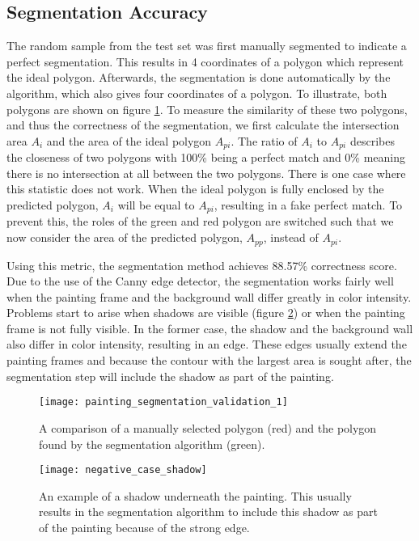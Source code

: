 \subsection{Segmentation Accuracy}
The random sample from the test set was first manually segmented to indicate a perfect segmentation. This results in 4 coordinates of a polygon which represent the ideal polygon. Afterwards, the segmentation is done automatically by the algorithm, which also gives four coordinates of a polygon. To illustrate, both polygons are shown on figure \ref{fig:painting_segmentation_validation_1}.
To measure the similarity of these two polygons, and thus the correctness of the segmentation, we first calculate the intersection area $A_i$ and the area of the ideal polygon $A_{pi}$. The ratio of $A_i$ to $A_{pi}$ describes the closeness of two polygons with 100\% being a perfect match and 0\% meaning there is no intersection at all between the two polygons. There is one case where this statistic does not work. When the ideal polygon is fully enclosed by the predicted polygon, $A_i$ will be equal to $A_{pi}$, resulting in a fake perfect match. To prevent this, the roles of the green and red polygon are switched such that we now consider the area of the predicted polygon, $A_{pp}$, instead of $A_{pi}$.

Using this metric, the segmentation method achieves 88.57\% correctness score. Due to the use of the Canny edge detector, the segmentation works fairly well when the painting frame and the background wall differ greatly in color intensity. Problems start to arise when shadows are visible (figure \ref{fig:negative_case_shadow}) or when the painting frame is not fully visible. In the former case, the shadow and the background wall also differ in color intensity, resulting in an edge. These edges usually extend the painting frames and because the contour with the largest area is sought after, the segmentation step will include the shadow as part of the painting.


\begin{figure}
	\centering
	\texttt{[image: painting\_segmentation\_validation\_1]}
	\caption{A comparison of a manually selected polygon (red) and the polygon found by the segmentation algorithm (green).}
	\label{fig:painting_segmentation_validation_1}
\end{figure}
\begin{figure}
	\texttt{[image: negative\_case\_shadow]}
	\caption{An example of a shadow underneath the painting. This usually results in the segmentation algorithm to include this shadow as part of the painting because of the strong edge.}
	\label{fig:negative_case_shadow}
\end{figure}



